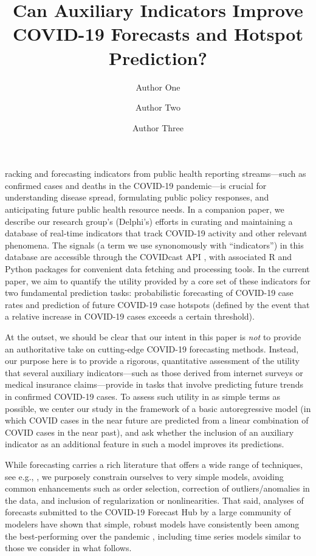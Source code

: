 \documentclass[9pt,twocolumn,twoside,lineno]{pnas-new}
\title{Can Auxiliary Indicators Improve COVID-19 Forecasts and Hotspot
  Prediction?}
\author[a,c,1]{Author One}
\author[b,1,2]{Author Two}
\author[a]{Author Three}
\affil[a]{Affiliation One}
\affil[b]{Affiliation Two}
\affil[c]{Affiliation Three}
\begin{document}
\maketitle
\thispagestyle{firststyle}

racking and forecasting indicators from public health reporting
streams---such as confirmed cases and deaths in the COVID-19 pandemic---is
crucial for understanding disease spread, formulating public policy responses,
and anticipating future public health resource needs.  In a companion paper, we
describe our research group's (Delphi's) efforts in curating and maintaining a 
database of real-time indicators that track COVID-19 activity and other relevant
phenomena. The signals (a term we use synonomously with ``indicators'') in this
database are accessible through the COVIDcast API \cite{CovidcastAPI}, with
associated R \cite{CovidcastR} and Python \cite{CovidcastPy} packages for
convenient data fetching and processing tools. In the current paper, we aim to
quantify the utility provided by a core set of these indicators for two
fundamental prediction tasks: probabilistic forecasting of COVID-19 case 
rates and prediction of future COVID-19 case hotspots (defined by the event that
a relative increase in COVID-19 cases exceeds a certain threshold). 

At the outset, we should be clear that our intent in this paper is \textit{not}
to provide an authoritative take on cutting-edge COVID-19 forecasting methods.
Instead, our purpose here is to provide a rigorous, quantitative assessment of
the utility that several auxiliary indicators---such as those derived from
internet surveys or medical insurance claims---provide in tasks that involve
predicting future trends in confirmed COVID-19 cases. To assess such utility in
as simple terms as possible, we center our study in the framework of a basic
autoregressive model (in which COVID cases in the near future are predicted from  
a linear combination of COVID cases in the near past), and ask whether the 
inclusion of an auxiliary indicator as an additional feature in such a model
improves its predictions. 

While forecasting carries a rich literature that offers a wide range of
techniques, see e.g., \cite{Hyndman:2018}, we purposely constrain ourselves to
very simple models, avoiding common enhancements such as order selection,
correction of outliers/anomalies in the data, and inclusion of regularization or
nonlinearities. That said, analyses of forecasts submitted to the COVID-19
Forecast Hub \cite{ForecastHub} by a large community of modelers have shown that
simple, robust models have consistently been among the best-performing over the
pandemic \cite{Cramer:2021}, including time series models similar to those we
consider in what follows.   
\end{document}
